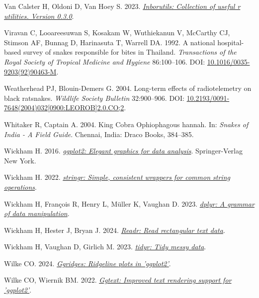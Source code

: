 \documentclass[10pt,a4paper]{article}
\newlength{\cslhangindent}
\newenvironment{CSLReferences}[2] %
 {\begin{list}{}{%
  \setlength{\itemindent}{0pt}
  \setlength{\leftmargin}{0pt}
  \setlength{\parsep}{0pt}
  \ifodd #1
   \setlength{\leftmargin}{\cslhangindent}
   \setlength{\itemindent}{-1\cslhangindent}
  \fi
  \setlength{\itemsep}{#2\baselineskip}}}
 {\end{list}}
\begin{document}
\begin{CSLReferences}{1}{0}
Van Calster H, Oldoni D, Van Hoey S. 2023. \emph{\href{https://inbo.github.io/inborutils/}{Inborutils: Collection of useful r utilities. Version 0.3.0}}.

Viravan C, Looareesuwan S, Kosakam W, Wuthiekanun V, McCarthy CJ, Stimson AF, Bunnag D, Harinasuta T, Warrell DA. 1992. A national hospital-based survey of snakes responsible for bites in {Thailand}. \emph{Transactions of the Royal Society of Tropical Medicine and Hygiene} 86:100--106. DOI: \href{https://doi.org/10.1016/0035-9203(92)90463-M}{10.1016/0035-9203(92)90463-M}.

Weatherhead PJ, Blouin-Demers G. 2004. Long-term effects of radiotelemetry on black ratsnakes. \emph{Wildlife Society Bulletin} 32:900--906. DOI: \href{https://doi.org/10.2193/0091-7648(2004)032\%5B0900:LEOROB\%5D2.0.CO;2}{10.2193/0091-7648(2004)032{[}0900:LEOROB{]}2.0.CO;2}.

Whitaker R, Captain A. 2004. King {Cobra} {Ophiophagous} hannah. In: \emph{Snakes of {India} - {A} {Field} {Guide}}. Chennai, India: Draco Books, 384--385.

Wickham H. 2016. \emph{\href{https://ggplot2.tidyverse.org}{ggplot2: Elegant graphics for data analysis}}. Springer-Verlag New York.

Wickham H. 2022. \emph{\href{https://CRAN.R-project.org/package=stringr}{{stringr}: Simple, consistent wrappers for common string operations}}.

Wickham H, François R, Henry L, Müller K, Vaughan D. 2023. \emph{\href{https://CRAN.R-project.org/package=dplyr}{{dplyr}: A grammar of data manipulation}}.

Wickham H, Hester J, Bryan J. 2024. \emph{\href{https://CRAN.R-project.org/package=readr}{Readr: Read rectangular text data}}.

Wickham H, Vaughan D, Girlich M. 2023. \emph{\href{https://CRAN.R-project.org/package=tidyr}{{tidyr}: Tidy messy data}}.

Wilke CO. 2024. \emph{\href{https://CRAN.R-project.org/package=ggridges}{Ggridges: Ridgeline plots in 'ggplot2'}}.

Wilke CO, Wiernik BM. 2022. \emph{\href{https://CRAN.R-project.org/package=ggtext}{Ggtext: Improved text rendering support for 'ggplot2'}}.


\end{CSLReferences}
\end{document}
